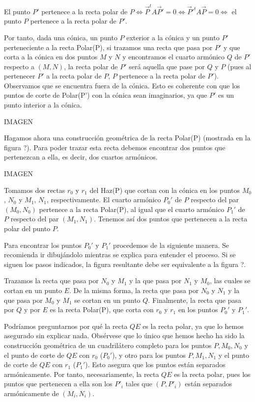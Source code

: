 \begin{obs}
	El punto $P'$ pertenece a la recta polar de $P\Leftrightarrow  \vec{P}^tA\vec{P}'=0\Leftrightarrow \vec{P}'^tA\vec{P}=0\Leftrightarrow $ el punto $P$ pertenece a la recta polar de $P'$.
\end{obs}

Por tanto, dada una cónica, un punto $P$ exterior a la cónica y un punto $P'$ perteneciente a la recta Polar(P), si trazamos una recta que pasa por $P'$ y que corta a la cónica en dos puntos $M$ y $N$ y encontramos el cuarto armónico $Q$ de $P'$ respecto a $(M,N)$, la recta polar de $P'$ será aquella que pase por $Q$ y $P$ (pues al pertenecer $P'$ a la recta polar de $P$, $P$ pertenece a la recta polar de $P'$). Observamos que se encuentra fuera de la cónica. Esto es coherente con que los puntos de corte de Polar(P') con la cónica sean imaginarios, ya que $P'$ es un punto interior a la cónica.

IMAGEN

Hagamos ahora una construcción geométrica de la recta Polar(P) (mostrada en la figura ?). Para poder trazar esta recta debemos encontrar dos puntos que pertenezcan a ella, es decir, dos cuartos armónicos.

IMAGEN

Tomamos dos rectas $r_0$ y $r_1$ del Haz(P) que cortan con la cónica en los puntos $M_0$, $N_0$ y $M_1$, $N_1$, respectivamente. El cuarto armónico $P_0'$ de $P$ respecto del par $(M_0,N_0)$ pertenece a la recta Polar(P), al igual que el cuarto armónico $P_1'$ de $P$ respecto del par $(M_1,N_1)$. Tenemos así dos puntos que pertenecen a la recta polar del punto $P$.

Para encontrar los puntos $P_0'$ y $P_1'$ procedemos de la siguiente manera. Se recomienda ir dibujándolo mientras se explica para entender el proceso. Si se siguen los pasos indicados, la figura resultante debe ser equivalente a la figura ?.

Trazamos la recta que pasa por $N_0$ y $M_1$ y la que pasa por $N_1$ y $M_0$, las cuales se cortan en un punto $E$. De la misma forma, la recta que pasa por $N_0$ y $N_1$ y la que pasa por $M_0$ y $M_1$ se cortan en un punto $Q$. Finalmente, la recta que pasa por $Q$ y por $E$ es la recta Polar(P), que corta con $r_0$ y $r_1$ en los puntos $P_0'$ y $P_1'$.

Podríamos preguntarnos por qué la recta $QE$ es la recta polar, ya que lo hemos asegurado sin explicar nada. Obsérvese que lo único que hemos hecho ha sido la construcción geométrica de un cuadrilátero completo para los puntos $P,M_0,N_0$ y el punto de corte de $QE$ con $r_0$ ($P_0'$), y otro para los puntos $P,M_1,N_1$ y el punto de corte de $QE$ con $r_1$ ($P_1'$). Esto asegura que los puntos están separados armónicamente. Por tanto, necesariamente, la recta $QE$ es la recta polar, pues los puntos que pertenecen a ella son los $P'_i$ tales que $(P,P'_i)$ están separados armónicamente de $(M_i,N_i)$.\\

